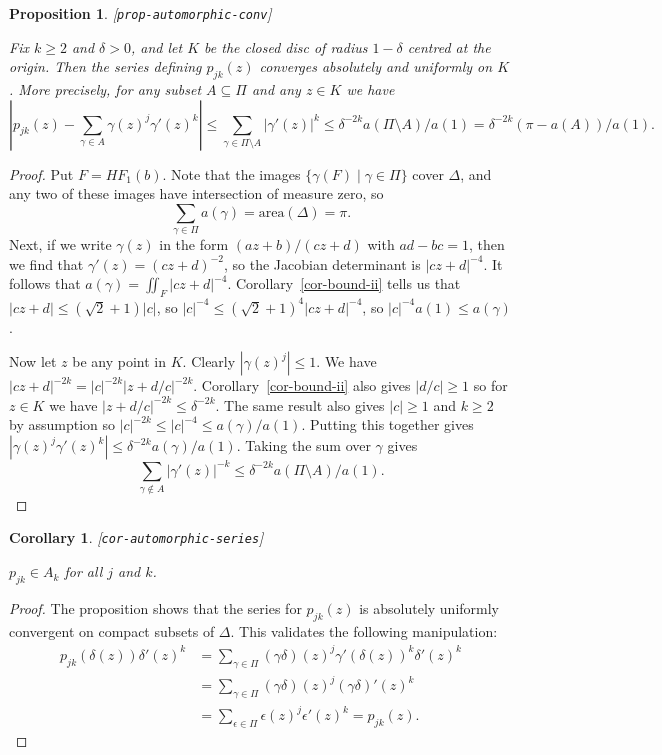 \documentclass[reqno]{amsart}
\newcommand{\lbl}[1]{\label{#1}\textup{[\texttt{#1}]}\par}
\newcommand{\lbl}{\label}
\newcommand{\Dl}        {\Delta}
\newcommand{\gm}        {\gamma}
\newcommand{\dl}        {\delta}
\newcommand{\ep}        {\epsilon}
\newcommand{\st}        {\;|\;}
\newcommand{\sm}        {\setminus}
\newcommand{\sse}       {\subseteq}
\renewcommand{\:}{\colon}
\newtheorem{proposition}[theorem]{Proposition}
\newtheorem{corollary}[theorem]{Corollary}
\theoremstyle{definition}
\begin{document}
\begin{proposition}\lbl{prop-automorphic-conv}
 Fix $k\geq 2$ and $\dl>0$, and let $K$ be the closed disc of radius
 $1-\dl$ centred at the origin.  Then the series defining $p_{jk}(z)$
 converges absolutely and uniformly on $K$.  More precisely, for any
 subset $A\sse\Pi$ and any $z\in K$ we have
 \[ \left|p_{jk}(z)-\sum_{\gm\in A}\gm(z)^j\gm'(z)^k\right|
     \leq \sum_{\gm\in\Pi\sm A} |\gm'(z)|^k
     \leq\dl^{-2k}a(\Pi\sm A)/a(1) = \dl^{-2k}(\pi - a(A))/a(1).
 \]
\end{proposition}
\begin{proof}
 Put $F=HF_1(b)$.  Note that the images $\{\gm(F)\st\gm\in\Pi\}$
 cover $\Dl$, and any two of these images have intersection of measure
 zero, so
 \[ \sum_{\gm\in\Pi}a(\gm)=\text{area}(\Dl)=\pi. \]
 Next, if we write $\gm(z)$ in the form $(az+b)/(cz+d)$ with
 $ad-bc=1$, then we find that $\gm'(z)=(cz+d)^{-2}$, so the Jacobian
 determinant is $|cz+d|^{-4}$.  It follows that
 $a(\gm)=\iint_{F}|cz+d|^{-4}$.   Corollary~\ref{cor-bound-ii} tells
 us that $|cz+d|\leq(\sqrt{2}+1)|c|$, so
 $|c|^{-4}\leq(\sqrt{2}+1)^4|cz+d|^{-4}$, so $|c|^{-4}a(1)\leq a(\gm)$.

 Now let $z$ be any point in $K$.  Clearly $|\gm(z)^j|\leq 1$.  We have
 $|cz+d|^{-2k}=|c|^{-2k}|z+d/c|^{-2k}$.  Corollary~\ref{cor-bound-ii}
 also gives $|d/c|\geq 1$ so for $z\in K$ we have
 $|z+d/c|^{-2k}\leq\dl^{-2k}$.  The same result also gives $|c|\geq 1$
 and $k\geq 2$ by assumption so
 $|c|^{-2k}\leq|c|^{-4}\leq a(\gm)/a(1)$.  Putting this together gives
 $|\gm(z)^j\gm'(z)^k|\leq\dl^{-2k}a(\gm)/a(1)$.  Taking the sum over $\gm$
 gives
 \[ \sum_{\gm\not\in A}|\gm'(z)|^{-k}\leq\dl^{-2k}a(\Pi\sm A)/a(1). \]
\end{proof}

\begin{corollary}\lbl{cor-automorphic-series}
 $p_{jk}\in A_k$ for all $j$ and $k$.
\end{corollary}
\begin{proof}
 The proposition shows that the series for $p_{jk}(z)$ is absolutely
 uniformly convergent on compact subsets of $\Dl$.  This validates the
 following manipulation:
 \begin{align*}
  p_{jk}(\dl(z))\dl'(z)^k &=
   \sum_{\gm\in\Pi} (\gm\dl)(z)^j \gm'(\dl(z))^k\dl'(z)^k \\
   &= \sum_{\gm\in\Pi} (\gm\dl)(z)^j (\gm\dl)'(z)^k \\
   &= \sum_{\ep\in\Pi} \ep(z)^j\ep'(z)^k = p_{jk}(z).
 \end{align*}
\end{proof}
\end{document}
